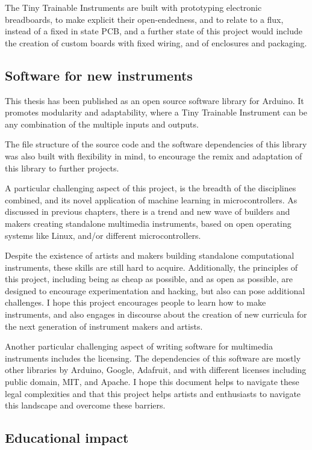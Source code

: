 The Tiny Trainable Instruments are built with prototyping electronic breadboards, to make explicit their open-endedness, and to relate to a flux, instead of a fixed in state PCB, and a further state of this project would include the creation of custom boards with fixed wiring, and of enclosures and packaging.


\subsection{Software for new instruments}

This thesis has been published as an open source software library for Arduino. It promotes modularity and adaptability, where a Tiny Trainable Instrument can be any combination of the multiple inputs and outputs.

The file structure of the source code and the software dependencies of this library was also built with flexibility in mind, to encourage the remix and adaptation of this library to further projects.

A particular challenging aspect of this project, is the breadth of the disciplines combined, and its novel application of machine learning in microcontrollers. As discussed in previous chapters, there is a trend and new wave of builders and makers creating standalone multimedia instruments, based on open operating systems like Linux, and/or different microcontrollers. 

Despite the existence of artists and makers building standalone computational instruments, these skills are still hard to acquire. Additionally, the principles of this project, including being as cheap as possible, and as open as possible, are designed to encourage experimentation and hacking, but also can pose additional challenges. I hope this project encourages people to learn how to make instruments, and also engages in discourse about the creation of new curricula for the next generation of instrument makers and artists.

Another particular challenging aspect of writing software for multimedia instruments includes the licensing. The dependencies of this software are mostly other libraries by Arduino, Google, Adafruit, and with different licenses including public domain, MIT, and Apache. I hope this document helps to navigate these legal complexities and that this project helps artists and enthusiasts to navigate this landscape and overcome these barriers.

\subsection{Educational impact}

